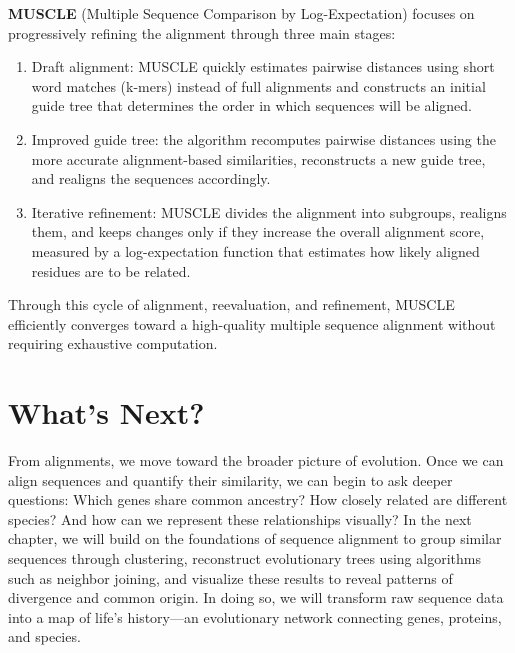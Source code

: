 \textbf{MUSCLE} (Multiple Sequence Comparison by Log-Expectation) focuses on progressively refining the alignment through three main stages:
\begin{enumerate}
    \item Draft alignment: MUSCLE quickly estimates pairwise distances using short word matches (k-mers) instead of full alignments and constructs an initial guide tree that determines the order in which sequences will be aligned.  
    \item Improved guide tree: the algorithm recomputes pairwise distances using the more accurate alignment-based similarities, reconstructs a new guide tree, and realigns the sequences accordingly.  
    \item Iterative refinement: MUSCLE divides the alignment into subgroups, realigns them, and keeps changes only if they increase the overall alignment score, measured by a log-expectation function that estimates how likely aligned residues are to be related.
\end{enumerate}
Through this cycle of alignment, reevaluation, and refinement, MUSCLE efficiently converges toward a high-quality multiple sequence alignment without requiring exhaustive computation.  

\section{What's Next?}

From alignments, we move toward the broader picture of evolution. Once we can align sequences and quantify their similarity, we can begin to ask deeper questions: Which genes share common ancestry? How closely related are different species? And how can we represent these relationships visually? In the next chapter, we will build on the foundations of sequence alignment to group similar sequences through clustering, reconstruct evolutionary trees using algorithms such as neighbor joining, and visualize these results to reveal patterns of divergence and common origin. In doing so, we will transform raw sequence data into a map of life's history—an evolutionary network connecting genes, proteins, and species.